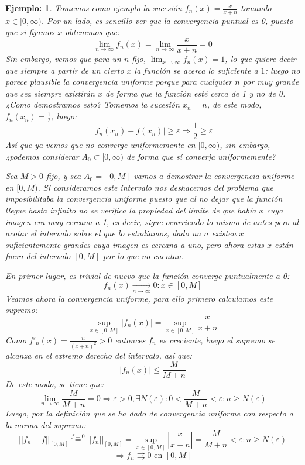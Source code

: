 \documentclass[10pt,a4paper,openright]{book}
\theoremstyle{break}
\newtheorem*{ej}{\underline{Ejemplo}:}
\begin{document}
\begin{ej}
Tomemos como ejemplo la sucesión $f_n(x) = \frac{x}{x+n}$ tomando $x\in [0,\infty)$. Por un lado, es sencillo ver que la convergencia puntual es 0, puesto que si fijamos $x$ obtenemos que:
$$\lim_{n \rightarrow \infty} f_n(x) =\lim_{n \rightarrow \infty} \frac{x}{x+n} = 0$$
Sin embargo, vemos que para un $n$ fijo, $\lim_{x \rightarrow \infty} f_n(x) = 1$, lo que quiere decir que siempre a partir de un cierto $x$ la función se acerca lo suficiente a $1$; luego no parece plausible la convergencia uniforme porque para cualquier $n$ por muy grande que sea siempre existirán $x$ de forma que la función esté cerca de 1 y no de 0. ¿Como demostramos esto? Tomemos la sucesión $x_n = n$, de este modo, $f_n(x_n) = \frac{1}{2}$, luego:
$$|f_n(x_n)-f(x_n)|\geq \varepsilon\Rightarrow \frac{1}{2} \geq \varepsilon$$
Así que ya vemos que no converge uniformemente en $[0,\infty)$, sin embargo, ¿podemos considerar $A_0\subset [0,\infty)$ de forma que sí converja uniformemente?

Sea $M > 0$ fijo, y sea $A_0 = [0,M]$ vamos a demostrar la convergencia uniforme en $[0,M)$. Si consideramos este intervalo nos deshacemos del problema que imposibilitaba la convergencia uniforme puesto que al no dejar que la función llegue hasta infinito no se verifica la propiedad del límite de que había $x$ cuya imagen era muy cercana a 1, es decir, sigue ocurriendo lo mismo de antes pero al acotar el intervalo sobre el que lo estudiamos, dado un $n$ existen $x$ suficientemente grandes cuya imagen es cercana a uno, pero ahora estas $x$ están fuera del intervalo $[0,M]$ por lo que no cuentan.

En primer lugar, es trivial de nuevo que la función converge puntualmente a 0:
$$f_n (x)\underset{n \to \infty}{\longrightarrow} 0 : x \in [0,M]$$
Veamos ahora la convergencia uniforme, para ello primero calculamos este supremo:
$$\underset{x \in [0,M]}{\sup} |f_n(x)| = \underset{x \in [0,M]}{\sup} \frac{x}{x+n}$$
Como $f'_n (x) = \frac{n}{(x+n)^2} > 0$ entonces $f_n $ es creciente, luego el supremo se alcanza en el extremo derecho del intervalo, así que:
$$|f_n (x)| \leq \frac{M}{M + n}$$
De este modo, se tiene que:
$$\lim_{n \to \infty} \frac{M}{M + n} = 0 \Rightarrow \varepsilon > 0, \exists N (\varepsilon) : 0 < \frac{M}{M + n} < \varepsilon: n \geq N(\varepsilon)$$
Luego, por la definición que se ha dado de convergencia uniforme con respecto a la norma del supremo:
$$||f_n - f||_{[0,M]} \stackrel{f=0}{=} ||f_n||_{[0,M]} = \underset{x \in [0,M]}{\sup} \left| \frac{x}{x+n} \right|= \frac{M}{M+n} < \varepsilon : n \geq N(\varepsilon)$$
$$\Rightarrow f_n \rightrightarrows 0 \mbox{ en } [0,M]$$
\end{ej}
\end{document}

